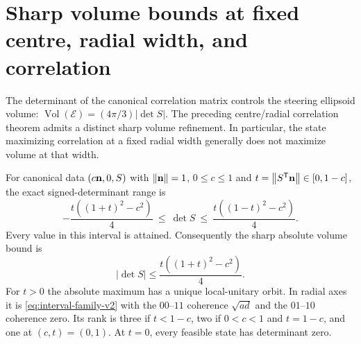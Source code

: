 \section{Sharp volume bounds at fixed centre, radial width, and correlation}
\label{sec:volume-v2}
The determinant of the canonical correlation matrix controls the steering
ellipsoid volume: $\operatorname{Vol}(\mathcal E)=(4\pi/3)|\det S|$.
The preceding centre/radial correlation theorem admits a distinct sharp
volume refinement. In particular, the state maximizing correlation at a
fixed radial width generally does not maximize volume at that width.

\begin{theorem}\label{thm:volume-radial-v2}
For canonical data $(c\mathbf n,0,S)$ with $\left\lVert\mathbf n\right\rVert=1$, $0\leq c\leq1$ and
$t=\left\lVert S^{\mathsf T}\mathbf n\right\rVert\in[0,1-c]$, the exact signed-determinant range is
\begin{equation}\label{eq:signed-volume-v2}
 -\frac{t((1+t)^2-c^2)}4\ \leq\ \det S\ \leq\
 \frac{t((1-t)^2-c^2)}4.
\end{equation}
Every value in this interval is attained. Consequently the sharp absolute
volume bound is
\begin{equation}\label{eq:volume-radial-v2}
 \boxed{\quad |\det S|\leq \frac{t((1+t)^2-c^2)}4.\quad}
\end{equation}
For $t>0$ the absolute maximum has a unique local-unitary orbit. In radial
axes it is \eqref{eq:interval-family-v2} with the $00$--$11$ coherence
$\sqrt{ad}$ and the $01$--$10$ coherence zero. Its rank is three if
$t<1-c$, two if $0<c<1$ and $t=1-c$, and one at $(c,t)=(0,1)$.
At $t=0$, every feasible state has determinant zero.
\end{theorem}

